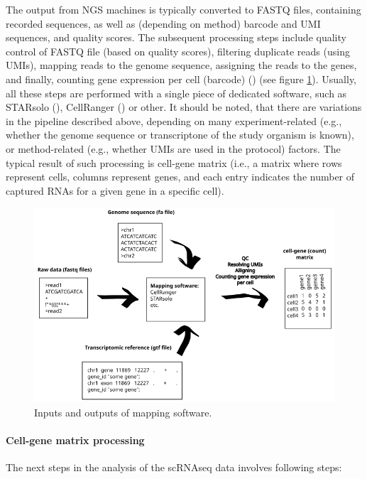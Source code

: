The output from NGS machines is typically converted to FASTQ files, containing recorded sequences,
as well as (depending on method) barcode and UMI sequences, and quality scores.
The subsequent processing steps include quality control of FASTQ file (based on quality scores),
filtering duplicate reads (using UMIs), mapping reads to the genome sequence, assigning the reads to the genes,
and finally, counting gene expression per cell (barcode) (\cite{Heumos2023}) (see figure \ref{fig:rawData}).
Usually, all these steps are performed with a single piece of dedicated software,
such as STARsolo (\cite{Kaminow2021}), CellRanger (\cite{Zheng2017}) or other.
It should be noted, that there are variations in the pipeline described above,
depending on many experiment-related (e.g., whether the genome sequence or transcriptone of the study organism is known),
or method-related (e.g., whether UMIs are used in the protocol) factors.
The typical result of such processing is cell-gene matrix (i.e., a matrix where rows represent cells,
columns represent genes, and each entry indicates the number of captured RNAs for a given gene in a specific cell).

\begin{figure}
  \centering
  \includegraphics[width=\linewidth]{images/rawdata.png}
  \caption{Inputs and outputs of mapping software.}
  \label{fig:rawData}
\end{figure}

\paragraph{Cell-gene matrix processing}

The next steps in the analysis of the scRNAseq data involves following steps:

